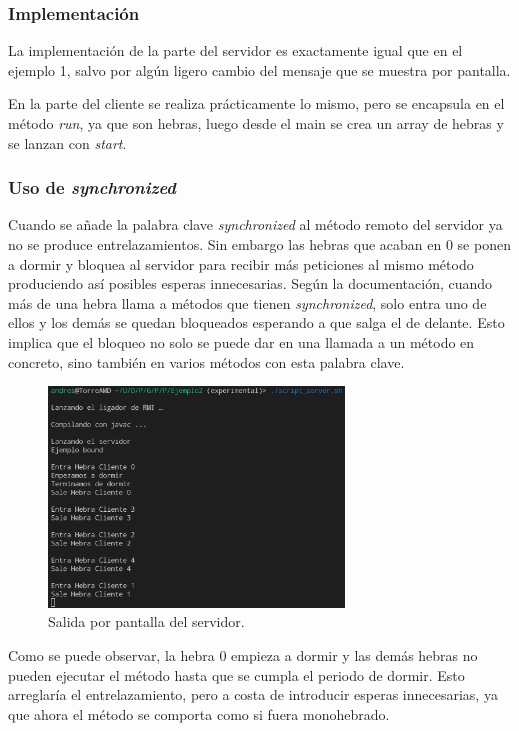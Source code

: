 \documentclass{article}
\begin{document}
\subsubsection{Implementación}
La implementación de la parte del servidor es exactamente igual que en el ejemplo 1, salvo por algún ligero cambio del mensaje que se muestra por pantalla.


En la parte del cliente se realiza prácticamente lo mismo, pero se encapsula en el método \textit{run}, ya que son hebras, luego desde el main se crea un array de hebras y se lanzan con \textit{start}.

\subsubsection{Uso de \textit{synchronized}}
Cuando se añade la palabra clave \textit{synchronized} al método remoto del servidor ya no se produce entrelazamientos. Sin embargo las hebras que acaban en 0 se ponen a dormir y bloquea al servidor para recibir más peticiones al mismo método produciendo así posibles esperas innecesarias. Según la documentación, cuando más de una hebra llama a métodos que tienen \textit{synchronized}, solo entra uno de ellos y los demás se quedan bloqueados esperando a que salga el de delante. Esto implica que el bloqueo no solo se puede dar en una llamada a un método en concreto, sino también en varios métodos con esta palabra clave.

\begin{figure}[H]
    \centering
    \includegraphics[width=0.7\textwidth]{imagenes/E2ServerSync1.png}
    \caption{Salida por pantalla del servidor.}
\end{figure}

Como se puede observar, la hebra 0 empieza a dormir y las demás hebras no pueden ejecutar el método hasta que se cumpla el periodo de dormir. Esto arreglaría el entrelazamiento, pero a costa de introducir esperas innecesarias, ya que ahora el método se comporta como si fuera monohebrado.
\end{document}
